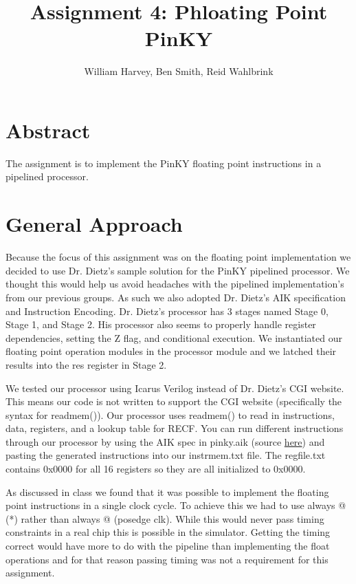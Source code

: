 \documentclass{article}
\begin{document}
\title{Assignment 4: Phloating Point PinKY}

\author{William Harvey, Ben Smith, Reid Wahlbrink}


\maketitle
\thispagestyle{empty}

\begin{multicols}{2}
\section{Abstract}
The assignment is to implement the PinKY floating point instructions in a pipelined processor.


\section{General Approach}
Because the focus of this assignment was on the floating point implementation we decided to use Dr. Dietz's sample solution for the PinKY pipelined processor. We thought this would help us avoid headaches with the pipelined implementation's from our previous groups. As such we also adopted Dr. Dietz's AIK specification and Instruction Encoding. Dr. Dietz's processor has 3 stages named Stage 0, Stage 1, and Stage 2. His processor also seems to properly handle register dependencies, setting the Z flag, and conditional execution. We instantiated our floating point operation modules in the processor module and we latched their results into the res register in Stage 2.

We tested our processor using Icarus Verilog instead of Dr. Dietz's CGI website. This means our code is not written to support the CGI website (specifically the syntax for readmem()). Our processor uses readmem() to read in instructions, data, registers, and a lookup table for RECF. You can run different instructions through our processor by using the AIK spec in pinky.aik (source \href{http://aggregate.org/EE480/PinKY.aik}{here}) and pasting the generated instructions into our instrmem.txt file. The regfile.txt contains 0x0000 for all 16 registers so they are all initialized to 0x0000.

As discussed in class we found that it was possible to implement the floating point instructions in a single clock cycle. To achieve this we had to use always @ (*) rather than always @ (posedge clk). While this would never pass timing constraints in a real chip this is possible in the simulator. Getting the timing correct would have more to do with the pipeline than implementing the float operations and for that reason passing timing was not a requirement for this assignment.


\end{multicols}
\end{document}
